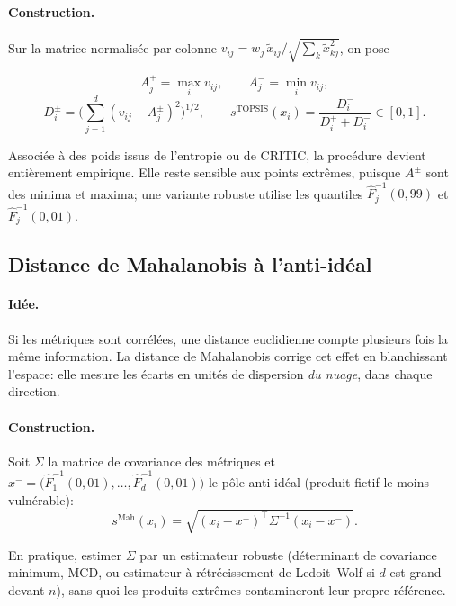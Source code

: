 \documentclass[11pt,a4paper]{article}
\theoremstyle{definition}
\theoremstyle{remark}
\begin{document}
\paragraph{Construction.} Sur la matrice normalisée par colonne
$v_{ij} = w_j\, \tilde{x}_{ij} / \sqrt{\sum_k \tilde{x}_{kj}^2}$, on pose

\medskip

\[
A^{+}_j = \max_i v_{ij},
\qquad
A^{-}_j = \min_i v_{ij},
\]
\[
D^{\pm}_i = \Big(\sum_{j=1}^d (v_{ij}-A^{\pm}_j)^2\Big)^{1/2},
\qquad
s^{\mathrm{TOPSIS}}(x_i) = \frac{D^{-}_i}{D^{+}_i + D^{-}_i} \in [0,1].
\]

\bigskip

Associée à des poids issus de l'entropie ou de CRITIC, la procédure devient entièrement
empirique. Elle reste sensible aux points extrêmes, puisque $A^{\pm}$ sont des minima et maxima;
une variante robuste utilise les quantiles $\hat F_j^{-1}(0{,}99)$ et $\hat F_j^{-1}(0{,}01)$.

\bigskip

\subsection{Distance de Mahalanobis à l'anti-idéal}
\label{sec:maha}

\medskip

\paragraph{Idée.} Si les métriques sont corrélées, une distance euclidienne compte plusieurs fois
la même information. La distance de Mahalanobis corrige cet effet en blanchissant l'espace:
elle mesure les écarts en unités de dispersion \emph{du nuage}, dans chaque direction.

\medskip

\paragraph{Construction.} Soit $\Sigma$ la matrice de covariance des métriques et
$x^{-} = \big(\hat F_1^{-1}(0{,}01),\dots,\hat F_d^{-1}(0{,}01)\big)$ le pôle anti-idéal
(produit fictif le moins vulnérable):
\[
s^{\mathrm{Mah}}(x_i) = \sqrt{(x_i - x^{-})^\top \Sigma^{-1} (x_i - x^{-})}.
\]

\bigskip

En pratique, estimer $\Sigma$ par un estimateur robuste (déterminant de covariance minimum, MCD,
ou estimateur à rétrécissement de Ledoit--Wolf si $d$ est grand devant $n$), sans quoi les
produits extrêmes contamineront leur propre référence.
\end{document}

